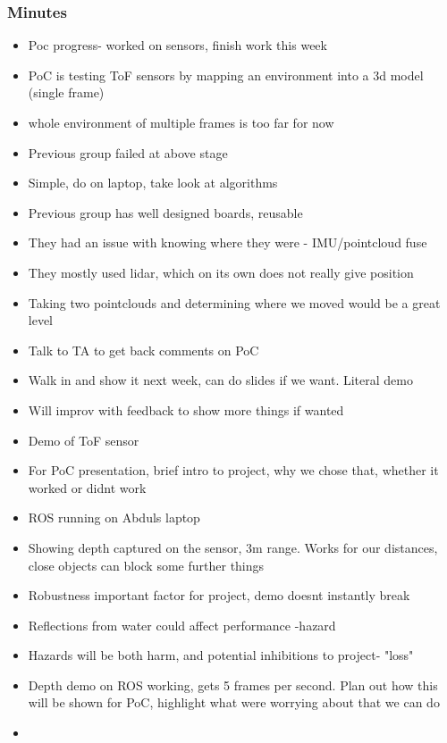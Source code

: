 		\subsubsection*{Minutes}
			\begin{itemize}
				\item Poc progress- worked on sensors, finish work this week
				\item PoC is testing ToF sensors by mapping an environment into a 3d model (single frame)
				\item whole environment of multiple frames is too far for now
				\item Previous group failed at above stage
				\item Simple, do on laptop, take look at algorithms
				\item Previous group has well designed boards, reusable
				\item They had an issue with knowing where they were - IMU/pointcloud fuse
				\item They mostly used lidar, which on its own does not really give position
				\item Taking two pointclouds and determining where we moved would be a great level
				\item Talk to TA to get back comments on PoC
				\item Walk in and show it next week, can do slides if we want. Literal demo
				\item Will improv with feedback to show more things if wanted
				\item Demo of ToF sensor 
				\item For PoC presentation, brief intro to project, why we chose that, whether it worked or didnt work
				\item ROS running on Abduls laptop
				\item Showing depth captured on the sensor, 3m range. Works for our distances, close objects can block some further things
				\item Robustness important factor for project, demo doesnt instantly break
				\item Reflections from water could affect performance -hazard
				\item Hazards will be both harm, and potential inhibitions to project- "loss"
				\item Depth demo on ROS working, gets 5 frames per second. Plan out how this will be shown for PoC, highlight what were worrying about that we can do
				\item 
			\end{itemize}

